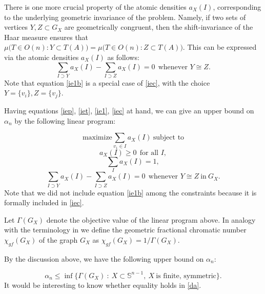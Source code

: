 \documentclass[11pt]{amsart}
\numberwithin{equation}{section}
\newcommand{\Sp}{\mathbb S}
\begin{document}
There is one more crucial property of the atomic densities $a_X(I)$, corresponding to the underlying geometric invariance of the problem. Namely, if two sets of vertices $Y,Z\subset G_X$ are geometrically congruent, then the shift-invariance of the Haar measure ensures that $\mu\Big( T\in O(n): Y\subset T(A)\Big)=\mu\Big( T\in O(n): Z\subset T(A)\Big)$. This can be expressed via the atomic densities $a_X(I)$ as follows: 
\begin{equation}\label{iec}
\sum_{I\supset Y} a_X(I)-\sum_{I\supset Z} a_X(I)=0  \ \ {\textrm{whenever \ }} Y\cong Z.
\end{equation}
Note that equation \eqref{ie1b} is a special case of \eqref{iec}, with the choice $Y=\{v_i\}, Z=\{v_j\}$.

Having equations \eqref{iep}, \eqref{iet}, \eqref{ie1}, \eqref{iec}  at hand, we can give an upper bound on $\alpha_n$ by the following linear program: 

\begin{equation}\label{gfcn}
{\textrm{maximize}} \sum_{v_1\in I} a_X(I) \ {\textrm{subject to}} 
\end{equation}
\begin{equation*}
a_X(I) \ge 0 \ \ {\textrm{for all \ }} I, 
\end{equation*}
\begin{equation*}
\sum_I a_X(I)= 1, 
\end{equation*}
\begin{equation*}
\sum_{I\supset Y} a_X(I)-\sum_{I\supset Z} a_X(I)=0  \ \ {\textrm{whenever \ }} Y\cong Z \ {\textrm{in}} \ G_X .
\end{equation*}
Note that we did not include equation \eqref{ie1b} among the constraints because it is formally included in \eqref{iec}. 

\medskip

Let $\Gamma(G_X)$ denote the objective value of the linear program above. In analogy with the terminology in \cite{ambrus} we define the geometric fractional chromatic number $\chi_{gf}(G_X)$ of the graph $G_X$ as  $\chi_{gf}(G_X)=1/\Gamma(G_X)$. 

\medskip

By the discussion above, we have the following upper bound on $\alpha_n$: 

\begin{equation}\label{da}
\alpha_n\le \inf\{ \Gamma(G_X) \ :\ X\subset\Sp^{n-1}, \ X \ {\textrm{is finite, symmetric}}\}.
\end{equation}
It would be interesting to know whether equality holds in \eqref{da}.
\end{document}
